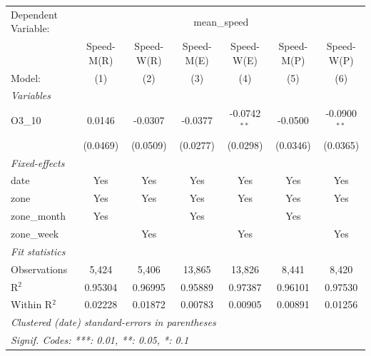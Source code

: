\begingroup
\centering
\begin{tabular}{lcccccc}
   \tabularnewline \midrule \midrule
   Dependent Variable: & \multicolumn{6}{c}{mean\_speed}\\
                & Speed-M(R) & Speed-W(R) & Speed-M(E) & Speed-W(E)     & Speed-M(P) & Speed-W(P) \\   
   Model:       & (1)        & (2)        & (3)        & (4)            & (5)        & (6)\\  
   \midrule
   \emph{Variables}\\
   O3\_10       & 0.0146     & -0.0307    & -0.0377    & -0.0742$^{**}$ & -0.0500    & -0.0900$^{**}$\\   
                & (0.0469)   & (0.0509)   & (0.0277)   & (0.0298)       & (0.0346)   & (0.0365)\\   
   \midrule
   \emph{Fixed-effects}\\
   date         & Yes        & Yes        & Yes        & Yes            & Yes        & Yes\\  
   zone         & Yes        & Yes        & Yes        & Yes            & Yes        & Yes\\  
   zone\_month  & Yes        &            & Yes        &                & Yes        & \\  
   zone\_week   &            & Yes        &            & Yes            &            & Yes\\  
   \midrule
   \emph{Fit statistics}\\
   Observations & 5,424      & 5,406      & 13,865     & 13,826         & 8,441      & 8,420\\  
   R$^2$        & 0.95304    & 0.96995    & 0.95889    & 0.97387        & 0.96101    & 0.97530\\  
   Within R$^2$ & 0.02228    & 0.01872    & 0.00783    & 0.00905        & 0.00891    & 0.01256\\  
   \midrule \midrule
   \multicolumn{7}{l}{\emph{Clustered (date) standard-errors in parentheses}}\\
   \multicolumn{7}{l}{\emph{Signif. Codes: ***: 0.01, **: 0.05, *: 0.1}}\\
\end{tabular}
\par\endgroup
